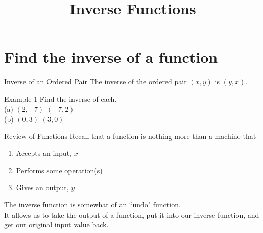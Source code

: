 \documentclass[t]{beamer}
\title{Inverse Functions}
\author{}
\date{}
\begin{document}
\begin{frame}{}
    \maketitle
\end{frame}

\section{Find the inverse of a function}

\begin{frame}{Inverse of an Ordered Pair}
The \alert{inverse} of the ordered pair $(x,y)$ is $(y,x)$.
\end{frame}

\begin{frame}{Example 1}
Find the inverse of each.	\newline\\
(a) \quad $(2,-7)$	\quad \pause $(-7,2)$	\newline\\	\pause
(b) \quad $(0,3)$ \quad \pause $(3,0)$
\end{frame}

\begin{frame}{Review of Functions}
Recall that a function is nothing more than a machine that	\newline\\
\begin{enumerate}
	\item Accepts an input, $x$	\newline\\	\pause
	\item Performs some operation(s)	\newline\\	\pause
	\item Gives an output, $y$	\newline\\	\pause
\end{enumerate}
The inverse function is somewhat of an {\color{blue}``undo"} function.	\newline\\	\pause
It allows us to take the output of a function, put it into our inverse function, and get our original input value back.
\end{frame}
\end{document}
